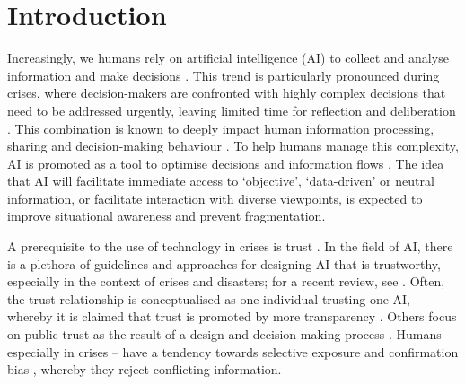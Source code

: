 \documentclass[pdflatex,sn-basic]{sn-jnl}
\begin{document}

\maketitle

\section{Introduction}\label{sec:intro}

Increasingly, we humans rely on artificial intelligence (AI) to collect and analyse information and make decisions \citep{klingbeil2024trust}.
This trend is particularly pronounced during crises, where decision-makers are confronted with highly complex decisions that need to be addressed urgently, leaving limited time for reflection and deliberation \citep{mendonca2001decision}.
This combination is known to deeply impact human information processing, sharing and decision-making behaviour \citep{comes2020coordination}.
To help humans manage this complexity, AI is promoted as a tool to optimise decisions and information flows \citep{jeon2024hearhere}.
The idea that AI will facilitate immediate access to `objective', `data-driven' or neutral information, or facilitate interaction with diverse viewpoints, is expected to improve situational awareness and prevent fragmentation.

A prerequisite to the use of technology in crises is trust \citep{steinbrink2024transparency}.
In the field of AI, there is a plethora of guidelines and approaches for designing AI that is trustworthy, especially in the context of crises and disasters; for a recent review, see \citet{albahri2024systematic}.
Often, the trust relationship is conceptualised as one individual trusting one AI, whereby it is claimed that trust is promoted by more transparency \citep{visave2025transparency}.
Others focus on public trust as the result of a design and decision-making process \citep{tzachor2020artificial}.
Humans -- especially in crises -- have a tendency towards selective exposure \citep{barbera2015tweeting} and confirmation bias \citep{paulus2024interplay}, whereby they reject conflicting information.
\end{document}

